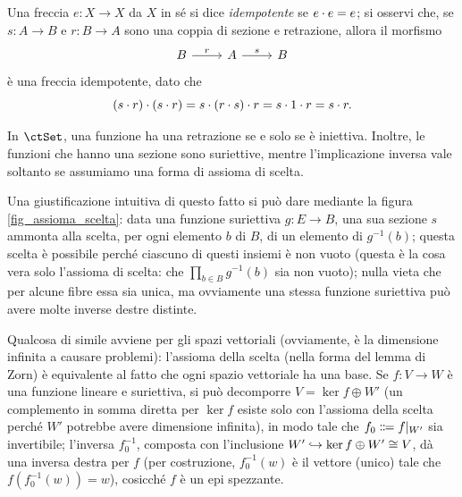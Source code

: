 \begin{remark}
 Una freccia \(e \colon X\to X\) da \(X\) in sé si dice \emph{idempotente} se \(e\cdot e=e\); si osservi che, se \(s \colon A \to B\) e \(r \colon B \to A\) sono una coppia di sezione e retrazione,
 allora il morfismo
 \begin{equation}
  \begin{tikzcd}
   B \ar[r, "r"] & A \ar[r, "s"] &B
  \end{tikzcd}
 \end{equation}
 è una freccia idempotente, dato che
 \[(s\cdot r)\cdot (s\cdot r) = s\cdot (r\cdot s)\cdot r = s\cdot 1\cdot r=s\cdot r.\]
\end{remark}

\begin{example}\label{scelta_epi_spez}
 \label{exm:set-sezioni-retrazioni}
 In \(\ctSet\), una funzione ha una retrazione se e solo se è iniettiva.
 Inoltre, le funzioni che hanno una sezione sono suriettive,
 mentre l'implicazione inversa vale soltanto se assumiamo una forma di assioma di scelta.

 Una giustificazione intuitiva di questo fatto si può dare mediante la figura \ref{fig_assioma_scelta}: data una funzione suriettiva \(g \colon E\to B\), una sua sezione \(s\) ammonta alla scelta, per ogni elemento \(b\) di \(B\), di un elemento di \(g^{-1}(b)\); questa scelta è possibile perché ciascuno di questi insiemi è non vuoto (questa è la cosa vera solo l'assioma di scelta: che \(\prod_{b\in B}g^{-1}(b)\) sia non vuoto); nulla vieta che per alcune fibre essa sia unica, ma ovviamente una stessa funzione suriettiva può avere molte inverse destre distinte.
\end{example}
\begin{remark}\label{scelta_epi_spez_2}
 Qualcosa di simile avviene per gli spazi vettoriali (ovviamente, è la dimensione infinita a causare problemi): l'assioma della scelta (nella forma del lemma di Zorn) è equivalente al fatto che ogni spazio vettoriale ha una base. Se \(f \colon V\to W\) è una funzione lineare e suriettiva, si può decomporre \(V = \ker f \oplus W'\) (un complemento in somma diretta per \(\ker f\) esiste solo con l'assioma della scelta perché \(W'\) potrebbe avere dimensione infinita), in modo tale che \(f_0 \defeq  f|_{W'}\) sia invertibile; l'inversa \(f_0^{-1}\), composta con l'inclusione \(W'\hookrightarrow \ker f \oplus W'\cong V\), dà una inversa destra per \(f\) (per costruzione, \(f_0^{-1}(w)\) è il vettore (unico) tale che \(f(f_0^{-1}(w)) = w\)), cosicché \(f\) è un epi spezzante.
\end{remark}

